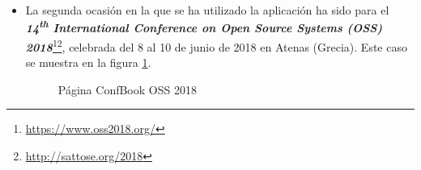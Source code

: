 \documentclass[a4paper, 12pt]{book}
\begin{document}
\begin{itemize}
\item La segunda ocasión en la que se ha utilizado la aplicación ha sido para el \textbf{\textit{14\textsuperscript{th} International Conference on Open Source Systems (OSS) 2018}}\footnote{\url{https://www.oss2018.org/}}\footnote{\url{http://sattose.org/2018}}, celebrada del 8 al 10 de junio de 2018 en Atenas (Grecia). Este caso se muestra en la figura \ref{fig:imgOSS}.
\begin{figure}[h!]
	\centering
	\caption{Página ConfBook OSS 2018}
	\label{fig:imgOSS}
\end{figure}


\end{itemize}
\end{document}
